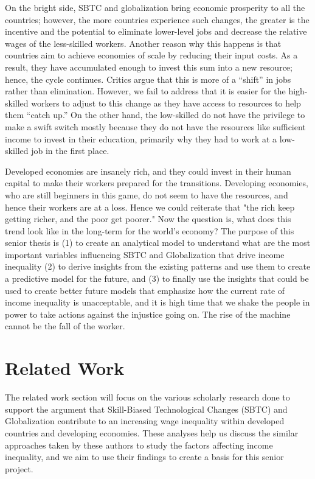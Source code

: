 \documentclass[12pt,oneside]{book} %
\begin{document}
On the bright side, SBTC and globalization bring economic prosperity to all the countries; however, the more countries experience such changes, the greater is the incentive and the potential to eliminate lower-level jobs and decrease the relative wages of the less-skilled workers. Another reason why this happens is that countries aim to achieve economies of scale by reducing their input costs. As a result, they have accumulated enough to invest this sum into a new resource; hence, the cycle continues. Critics argue that this is more of a “shift” in jobs rather than elimination. However, we fail to address that it is easier for the high-skilled workers to adjust to this change as they have access to resources to help them “catch up.” On the other hand, the low-skilled do not have the privilege to make a swift switch mostly because they do not have the resources like sufficient income to invest in their education, primarily why they had to work at a low-skilled job in the first place.

Developed economies are insanely rich, and they could invest in their human capital to make their workers prepared for the transitions. Developing economies, who are still beginners in this game, do not seem to have the resources, and hence their workers are at a loss. Hence we could reiterate that "the rich keep getting richer, and the poor get poorer." Now the question is, what does this trend look like in the long-term for the world's economy? The purpose of this senior thesis is (1) to create an analytical model to understand what are the most important variables influencing SBTC and Globalization that drive income inequality (2) to derive insights from the existing patterns and use them to create a predictive model for the future, and (3) to finally use the insights that could be used to create better future models that emphasize how the current rate of income inequality is unacceptable, and it is high time that we shake the people in power to take actions against the injustice going on. The rise of the machine cannot be the fall of the worker.


\section{Related Work}
\label{sec:relatedwork}

\hspace{20pt}The related work section will focus on the various scholarly research done to support the argument that Skill-Biased Technological Changes (SBTC) and Globalization contribute to an increasing wage inequality within developed countries and developing economies. These analyses help us discuss the similar approaches taken by these authors to study the factors affecting income inequality, and we aim to use their findings to create a basis for this senior project.
\end{document}
